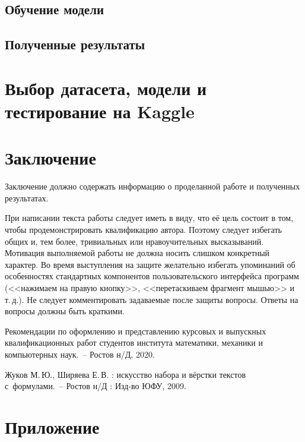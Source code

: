 \documentclass[14pt]{mmcs_article}
\begin{document}
\subsection{Обучение модели}

\subsection{Полученные результаты}

\newpage
\section{Выбор датасета, модели и тестирование на Kaggle}


\newpage
{}
\section*{Заключение}

Заключение должно содержать информацию о проделанной работе и полученных результатах.

При написании текста работы следует иметь в виду, что её цель состоит в том, чтобы продемонстрировать квалификацию автора. Поэтому следует избегать общих и, тем более, тривиальных или нравоучительных высказываний. Мотивация выполняемой работы не должна носить слишком конкретный характер. Во время выступления на защите желательно избегать упоминаний об особенностях стандартных компонентов пользовательского интерфейса программ (<<нажимаем на правую кнопку>>, <<перетаскиваем фрагмент мышью>> и т.\,д.). Не следует комментировать задаваемые после защиты вопросы. Ответы на вопросы должны быть краткими.



\newpage

\renewcommand{\refname}{\centering \textbf{Литература}}

\begin{thebibliography}{0}
Рекомендации по оформлению
и представлению курсовых
и выпускных квалификационных работ
студентов института математики,
механики и компьютерных наук.~--
Ростов н/Д, 2020.

Жуков М.\,Ю., Ширяева Е.\,В.
\LaTeXe: искусство набора и вёрстки текстов с~формулами.~-- Ростов н/Д : Изд-во ЮФУ, 2009.
\end{thebibliography}

\newpage

\section*{Приложение}
\end{document}
